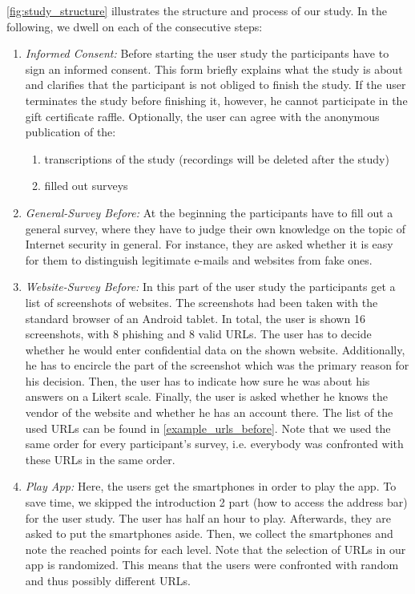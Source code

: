 \autoref{fig:study_structure} illustrates the structure and process of our study. In the following, we dwell on each of the consecutive steps:
\begin{enumerate}
	\item \textit{Informed Consent:} Before starting the user study the participants have to sign an informed consent.
This form briefly explains what the study is about and clarifies that the participant is not obliged to finish the study.
If the user terminates the study before finishing it, however, he cannot participate in the gift certificate raffle.
Optionally, the user can agree with the anonymous publication of the:
	\begin{enumerate}
		\item transcriptions of the study (recordings will be deleted after the study)
		\item filled out surveys
	\end{enumerate}

	\item \textit{General-Survey Before:} At the beginning the participants have to fill out a general survey, where they have to judge their own knowledge on the topic of Internet security in general.
 For instance, they are asked whether it is easy for them to distinguish legitimate e-mails and websites from fake ones.

	\item \textit{Website-Survey Before:} In this part of the user study the participants get a list of screenshots of websites.
 The screenshots had been taken with the standard browser of an Android tablet.
 In total, the user is shown 16 screenshots, with 8 phishing and 8 valid URLs.
 The user has to decide whether he would enter confidential data on the shown website.
 Additionally, he has to encircle the part of the screenshot which was the primary reason for his decision.
 Then, the user has to indicate how sure he was about his answers on a Likert scale.
 Finally, the user is asked whether he knows the vendor of the website and whether he has an account there.
 The list of the used URLs can be found in \autoref{example_urls_before}.
Note that we used the same order for every participant's survey, i.e. everybody was confronted with these URLs in the same order.

	\item \textit{Play App:} Here, the users get the smartphones in order to play the app.
 To save time, we skipped the introduction 2 part (how to access the address bar) for the user study.
 The user has half an hour to play.
 Afterwards, they are asked to put the smartphones aside.
 Then, we collect the smartphones and note the reached points for each level.
Note that the selection of URLs in our app is randomized.
This means that the users were confronted with random and thus possibly different URLs.


\end{enumerate}
